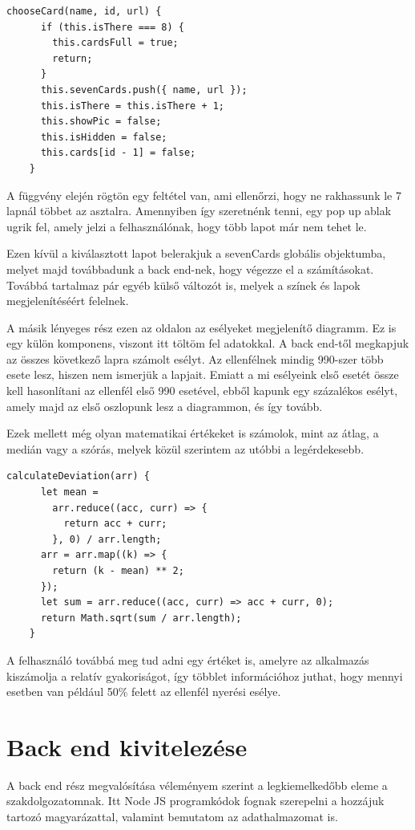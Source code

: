 \newpage

\begin{lstlisting}[style=htmlcssjs]
    chooseCard(name, id, url) {
      if (this.isThere === 8) {
        this.cardsFull = true;
        return;
      }
      this.sevenCards.push({ name, url });
      this.isThere = this.isThere + 1;
      this.showPic = false;
      this.isHidden = false;
      this.cards[id - 1] = false;
    }
\end{lstlisting}

A függvény elején rögtön egy feltétel van, ami ellenőrzi, hogy ne rakhassunk le 7 lapnál többet az asztalra. Amennyiben így szeretnénk tenni, egy pop up ablak ugrik fel, amely jelzi a felhasználónak, hogy több lapot már nem tehet le.

Ezen kívül a kiválasztott lapot belerakjuk a sevenCards globális objektumba, melyet majd továbbadunk a back end-nek, hogy végezze el a számításokat. Továbbá tartalmaz pár egyéb külső változót is, melyek a színek és lapok megjelenítéséért felelnek.

A másik lényeges rész ezen az oldalon az esélyeket megjelenítő diagramm. Ez is egy külön komponens, viszont itt töltöm fel adatokkal. A back end-től megkapjuk az összes következő lapra számolt esélyt. Az ellenfélnek mindig 990-szer több esete lesz, hiszen nem ismerjük a lapjait. Emiatt a mi esélyeink első esetét össze kell hasonlítani az ellenfél első 990 esetével, ebből kapunk egy százalékos esélyt, amely majd az első oszlopunk lesz a diagrammon, és így tovább. 

Ezek mellett még olyan matematikai értékeket is számolok, mint az átlag, a medián vagy a szórás, melyek közül szerintem az utóbbi a legérdekesebb.

\begin{lstlisting}[style=htmlcssjs]
    calculateDeviation(arr) {
      let mean =
        arr.reduce((acc, curr) => {
          return acc + curr;
        }, 0) / arr.length;
      arr = arr.map((k) => {
        return (k - mean) ** 2;
      });
      let sum = arr.reduce((acc, curr) => acc + curr, 0);
      return Math.sqrt(sum / arr.length);
    }
\end{lstlisting}

A felhasználó továbbá meg tud adni egy értéket is, amelyre az alkalmazás kiszámolja a relatív gyakoriságot, így többlet információhoz juthat, hogy mennyi esetben van például 50\% felett az ellenfél nyerési esélye.

\section{Back end kivitelezése}
A back end rész megvalósítása véleményem szerint a legkiemelkedőbb eleme a szakdolgozatomnak. Itt Node JS programkódok fognak szerepelni a hozzájuk tartozó magyarázattal, valamint bemutatom az adathalmazomat is.

